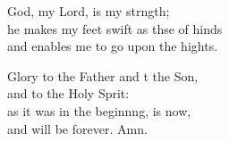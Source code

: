 \begin{psalmverse}
\begin{patverse}
God, my Lord, is my strngth;\Flex\\
he makes my feet swift as thse of hinds\Med\\
and enables me to go upon the hights.

Glory to the Father and t the Son,\Med\\
and to the Holy Sp\pointup{\i}rit:\\
as it was in the beginn\pointup{\i}ng, is now,\Med\\
and will be forever. Amn. 
  \end{patverse}
\end{psalmverse}
